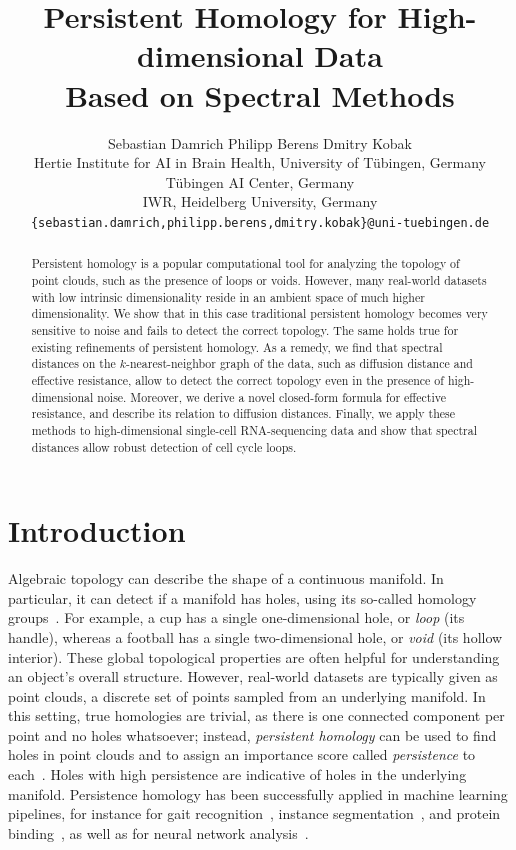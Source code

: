 \documentclass{article}
\title{Persistent Homology for High-dimensional Data \\Based on Spectral Methods}
\author{Sebastian Damrich\footnotemark[2] \hspace{1cm}
Philipp Berens\footnotemark[2]\hspace{0.15cm}\footnotemark[3]\hspace{1cm}
Dmitry Kobak\footnotemark[2]\hspace{0.15cm}\footnotemark[4]\\
\footnotemark[2]\hspace{0.2cm}Hertie Institute for AI in Brain Health, University of T\"{u}bingen, Germany\\
\footnotemark[3]\hspace{0.2cm}T\"{u}bingen AI Center, Germany\\
\footnotemark[4]\hspace{0.2cm}IWR, Heidelberg University, Germany\\
\texttt{\{sebastian.damrich,philipp.berens,dmitry.kobak\}@uni-tuebingen.de}
}
\theoremstyle{plain}
\theoremstyle{definition}
\theoremstyle{remark}
\begin{document}
\maketitle


\begin{abstract}
    Persistent homology is a popular computational tool for analyzing the topology of point clouds, such as the presence of loops or voids. However, many real-world datasets with low intrinsic dimensionality reside in an ambient space of much higher dimensionality. We show that in this case traditional persistent homology becomes very sensitive to noise and fails to detect the correct topology. The same holds true for existing refinements of persistent homology. As a remedy, we find that spectral distances on the $k$-nearest-neighbor graph of the data, such as diffusion distance and effective resistance, allow to detect the correct topology even in the presence of high-dimensional noise. Moreover, we derive a novel closed-form formula for effective resistance, and describe its relation to diffusion distances. Finally, we apply these methods to high-dimensional single-cell RNA-sequencing data and show that spectral distances allow robust detection of cell cycle loops.
\end{abstract}

\section{Introduction}

Algebraic topology can describe the shape of a continuous manifold. In particular, it can detect if a manifold has holes, using its so-called homology groups~\citep{hatcher2002algebraic}. For example, a cup has a single one-dimensional hole, or \textit{loop} (its handle), whereas a football has a single two-dimensional hole, or \textit{void} (its hollow interior). These global topological properties are often helpful for understanding an object's overall structure. However, real-world datasets are typically given as point clouds, a discrete set of points sampled from an underlying manifold. In this setting, true homologies are trivial, as there is one connected component per point and no holes whatsoever; instead, \textit{persistent homology} can be used to find holes in point clouds and to assign an importance score called \textit{persistence} to each~\citep{edelsbrunner2002topological, zomorodian2004computing}. Holes with high persistence are indicative of holes in the underlying manifold. Persistence homology has been successfully applied in machine learning pipelines, for instance for gait recognition~\citep{lamar2012human}, instance segmentation~\citep{hu2019topology}, and protein binding~\citep{wang2020topology}, as well as for neural network analysis~\citep{rieck2018neural}.
\end{document}
